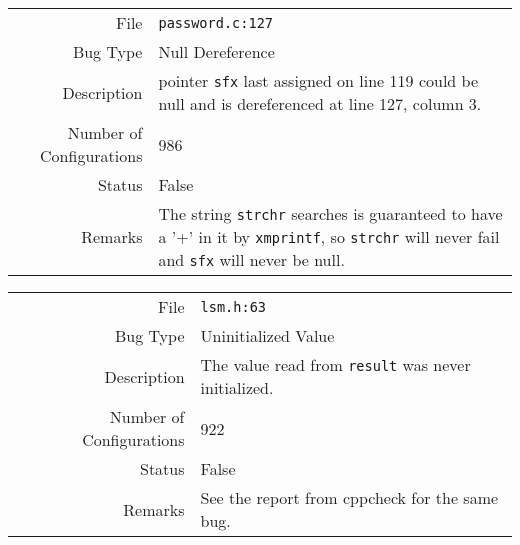 \noindent\begin{tabularx}{\textwidth}{rY}
  \toprule
  File & \texttt{password.c:127}\\
  Bug Type & Null Dereference\\
  Description & pointer \texttt{sfx} last assigned on line 119 could be null and is dereferenced at line 127, column 3.\\
  Number of Configurations & 986\\
  \midrule
  Status & False\\
  Remarks & The string \texttt{strchr} searches is guaranteed to have a '+' in it by \texttt{xmprintf}, so \texttt{strchr} will never fail and \texttt{sfx} will never be null.\\
  \bottomrule
\end{tabularx}

\pagebreak

\noindent\begin{tabularx}{\textwidth}{rY}
  \toprule
  File & \texttt{lsm.h:63}\\
  Bug Type & Uninitialized Value\\
  Description & The value read from \texttt{result} was never initialized.\\
  Number of Configurations & 922\\
  \midrule
  Status & False\\
  Remarks & See the report from cppcheck for the same bug.\\
  \bottomrule
\end{tabularx}


